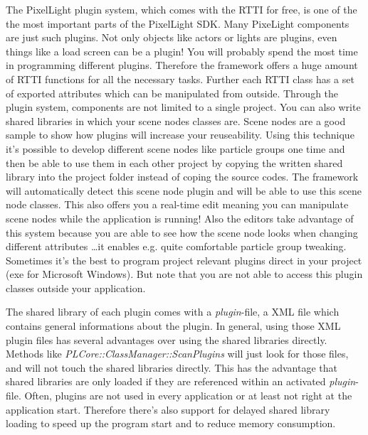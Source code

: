 The PixelLight plugin system, which comes with the \ac{RTTI} for free, is one of the the most important parts of the PixelLight \ac{SDK}. Many PixeLight components are just such plugins. Not only objects like actors or lights are plugins, even things like a load screen can be a plugin! You will probably spend the most time in programming different plugins. Therefore the framework offers a huge amount of \ac{RTTI} functions for all the necessary tasks. Further each \ac{RTTI} class has a set of exported attributes which can be manipulated from outside. Through the plugin system, components are not limited to a single project. You can also write shared libraries in which your scene nodes classes are. Scene nodes are a good sample to show how plugins will increase your reuseability. Using this technique it's possible to develop different scene nodes like particle groups one time and then be able to use them in each other project by copying the written shared library into the project folder instead of coping the source codes. The framework will automatically detect this scene node plugin and will be able to use this scene node classes. This also offers you a real-time edit meaning you can manipulate scene nodes while the application is running! Also the editors take advantage of this system because you are able to see how the scene node looks when changing different attributes \ldots it enables e.g. quite comfortable particle group tweaking. Sometimes it's the best to program project relevant plugins direct in your project (exe for Microsoft Windows). But note that you are not able to access this plugin classes outside your application.

The shared library of each plugin comes with a \emph{plugin}-file, a \ac{XML} file which contains general informations about the plugin. In general, using those \ac{XML} plugin files has several advantages over using the shared libraries directly. Methods like \emph{PLCore::ClassManager::ScanPlugins} will just look for those files, and will not touch the shared libraries directly. This has the advantage that shared libraries are only loaded if they are referenced within an activated \emph{plugin}-file. Often, plugins are not used in every application or at least not right at the application start. Therefore there's also support for delayed shared library loading to speed up the program start and to reduce memory consumption.


